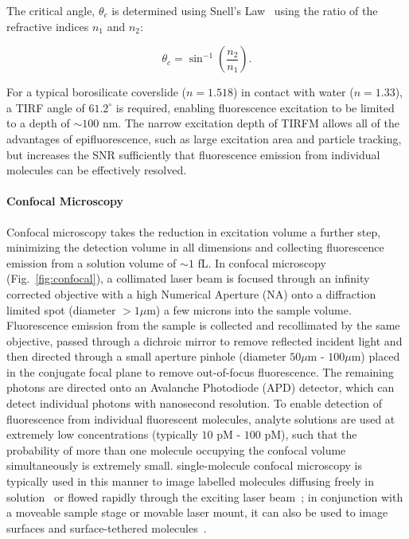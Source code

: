 The critical angle, $\theta_c$ is determined using Snell's Law~\cite{Wolf1995} using the ratio of the refractive indices $n_1$ and $n_2$:

\begin{equation}
\theta_c = \sin^{-1}\left(\frac{n_2}{n_1}\right).
\label{eq:snell}
\end{equation}

For a typical borosilicate coverslide ($n = 1.518$) in contact with water ($n = 1.33$), a TIRF angle of $61.2^{\circ}$ is required, enabling fluorescence excitation to be limited to a depth of $\sim 100$ nm. The narrow excitation depth of TIRFM allows all of the advantages of epifluorescence, such as large excitation area and particle tracking, but increases the SNR sufficiently that fluorescence emission from individual molecules can be effectively resolved.

\paragraph{Confocal Microscopy}
Confocal microscopy takes the reduction in excitation volume a further step, minimizing the detection volume in all dimensions and collecting fluorescence emission from a solution volume of $\sim 1$ fL. In confocal microscopy (Fig.~\ref{fig:confocal}), a collimated laser beam is focused through an infinity corrected objective with a high Numerical Aperture (NA) onto a diffraction limited spot (diameter $> 1 \mu$m) a few microns into the sample volume. Fluorescence emission from the sample is collected and recollimated by the same objective, passed through a dichroic mirror to remove reflected incident light and then directed through a small aperture pinhole (diameter $50 \mu$m - $100 \mu$m) placed in the conjugate focal plane to remove out-of-focus fluorescence. The remaining photons are directed onto an Avalanche Photodiode (APD) detector, which can detect individual photons with nanosecond resolution. To enable detection of fluorescence from individual fluorescent molecules, analyte solutions are used at extremely low concentrations (typically $10$ pM - $100$ pM), such that the probability of more than one molecule occupying the confocal volume simultaneously is extremely small. single-molecule confocal microscopy is typically used in this manner to image labelled molecules diffusing freely in solution~\cite{weiss00} or flowed rapidly through the exciting laser beam~\cite{horrocks2012}; in conjunction with a moveable sample stage or movable laser mount, it can also be used to image surfaces and surface-tethered molecules~\cite{Brown2008}. 


